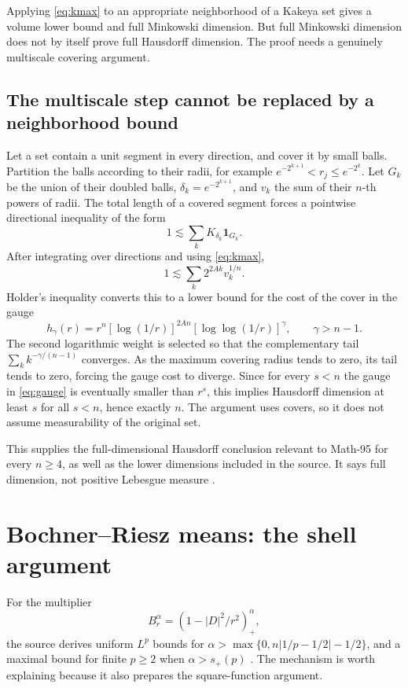 \documentclass[11pt,a4paper]{article}
\numberwithin{equation}{section}
\theoremstyle{definition}
\theoremstyle{remark}
\newcommand{\one}{\mathbf 1}
\begin{document}
Applying \eqref{eq:kmax} to an appropriate neighborhood of a Kakeya set gives
a volume lower bound and full Minkowski dimension. But full Minkowski dimension
does not by itself prove full Hausdorff dimension. The proof needs a genuinely
multiscale covering argument.

\subsection{The multiscale step cannot be replaced by a neighborhood bound}
Let a set contain a unit segment in every direction, and cover it by small
balls. Partition the balls according to their radii, for example
$e^{-2^{k+1}}<r_j\le e^{-2^k}$. Let $G_k$ be the union of their doubled balls,
$\delta_k=e^{-2^{k+1}}$, and $v_k$ the sum of their $n$-th powers of radii.
The total length of a covered segment forces a pointwise directional inequality
of the form
\[
 1\lesssim\sum_k K_{\delta_k}\one_{G_k}.
\]
After integrating over directions and using \eqref{eq:kmax},
\[
 1\lesssim\sum_k 2^{2Ak}v_k^{1/n}.
\]
Holder's inequality converts this to a lower bound for the cost of the cover
in the gauge
\begin{equation}\label{eq:gauge}
 h_\gamma(r)=r^n[\log(1/r)]^{2An}
                  [\log\log(1/r)]^\gamma,
 \qquad \gamma>n-1.
\end{equation}
The second logarithmic weight is selected so that the complementary tail
$\sum_k k^{-\gamma/(n-1)}$ converges. As the maximum covering radius tends
to zero, its tail tends to zero, forcing the gauge cost to diverge. Since for
every $s<n$ the gauge in \eqref{eq:gauge} is eventually smaller than $r^s$,
this implies Hausdorff dimension at least $s$ for all $s<n$, hence exactly $n$.
The argument uses covers, so it does not assume measurability of the original
set.

This supplies the full-dimensional Hausdorff conclusion relevant to Math-95
for every $n\ge4$, as well as the lower dimensions included in the source.
It says full dimension, not positive Lebesgue measure
\cite{kakeya-proof,kakeya-catalogue}.

\section{Bochner--Riesz means: the shell argument}
\label{sec:br}
For the multiplier
\[
 B_r^\alpha=(1-|D|^2/r^2)_+^\alpha,
\]
the source derives uniform $L^p$ bounds for
$\alpha>\max\{0,n|1/p-1/2|-1/2\}$, and a maximal bound for finite
$p\ge2$ when $\alpha>s_+(p)$ \cite{consequences}.
The mechanism is worth explaining because it also prepares the square-function
argument.
\end{document}
